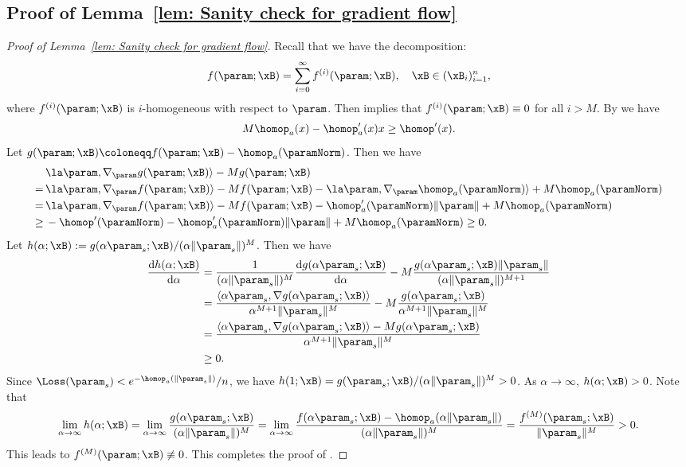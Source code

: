 \subsection{Proof of Lemma~\ref{lem: Sanity check for gradient flow}} \label{sec:proof: sanity check gf}
\begin{proof}[Proof of Lemma~\ref{lem: Sanity check for gradient flow}]
    Recall that we have  the      decomposition: 
    \[
        f(\param; \xB) = \sum_{i=0}^\infty f^{(i)}(\param;\xB),\quad \xB\in(\xB_i)_{i=1}^n,
    \]
    where $f^{(i)}(\param;\xB)$ is $i$-homogeneous with respect to $\param$. Then  implies that $f^{(i)}(\param;\xB)\equiv 0$ for all $i>M$. 
    By  we have 
    \[
        M \homop_a(x) - \homop_a^\prime (x) x \ge \homop^\prime (x). 
    \]
 Let $g(\param;\xB)\coloneqq f(\param;\xB) - \homop_a(\paramNorm)$. Then we have 
\begin{align*}
&\la \param, \nabla_{\param} g(\param;\xB) \rangle  - M g(\param;\xB)\\ 
= \, & \la \param, \nabla_{\param} f(\param;\xB) \rangle - M f(\param;\xB) - \la \param, \nabla_{\param} \homop_a(\paramNorm) \rangle + M \homop_a(\paramNorm)\\
= \, & \la \param, \nabla_{\param} f(\param;\xB) \rangle - M f(\param;\xB) -  \homop_a^\prime (\paramNorm) \|\param\|  + M \homop_a(\paramNorm) \\ 
\ge \, & -\homop^\prime (\paramNorm) - \homop_a^\prime (\paramNorm) \|\param\|  + M \homop_a(\paramNorm) \ge 0. 
\end{align*}
Let $h(\alpha;\xB) := g(\alpha \param_s;\xB)/(\alpha \|\param_s\|)^M$. 
Then we have 
\begin{align*}
\frac{\mathrm{d} h(\alpha ;\xB)}{\mathrm{d} \alpha }  
&= \frac{1}{(\alpha \|\param_s\|)^M} \frac{\mathrm{d} g(\alpha \param_s;\xB)}{\mathrm{d} \alpha} - M \frac{g(\alpha \param_s;\xB) \|\param_s\|}{(\alpha \|\param_s\|)^{M+1}}\\
&= \frac{\langle \alpha \param_s, \nabla g(\alpha \param_s ; \xB) \rangle }{\alpha^{M+1} \|\param_s\|^M}  - M \frac{g(\alpha \param_s;\xB)}{\alpha^{M+1} \|\param_s\|^{M}}\\
& = \frac{\langle \alpha \param_s, \nabla g(\alpha \param_s ; \xB) \rangle  - Mg(\alpha  \param_s;\xB)}{\alpha^{M+1} \|\param_s\|^M}\\ 
&\ge 0. 
\end{align*}
Since $\Loss(\param_s) <  e^{-\homop_a(\|\param_s\|)}/n$, we have $h(1;\xB)=g(\param_s;\xB)/(\alpha \|\param_s\|)^M >0$. As $\alpha \to \infty$, $h(\alpha;\xB)>0$. Note that 
\[
    \lim_{\alpha \to \infty} h(\alpha;\xB) = \lim_{\alpha \to \infty} \frac{ g(\alpha \param_s;\xB)}{(\alpha \|\param_s\|)^M}  = \lim_{\alpha \to \infty} \frac{ f(\alpha \param_s;\xB) - \homop_a(\alpha \|\param_s\|)}{(\alpha\|\param_s\|)^M} = \frac{ f^{(M)}( \param_s;\xB) }{ \|\param_s\|^M} >0. 
\] 
This leads to $f^{(M)}(\param;\xB) \not \equiv 0$.  This completes the proof of .
\end{proof}
